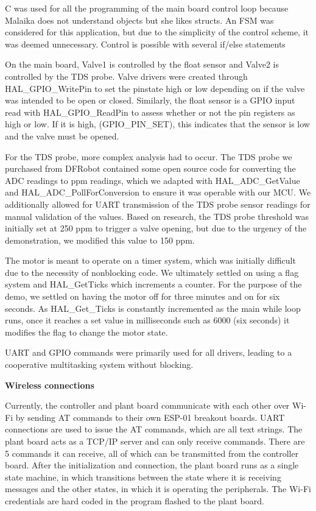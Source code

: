 C was used for all the programming of the main board control loop because Malaika does not understand objects but she likes structs. An FSM was considered for this application, but due to the simplicity of the control scheme, it was deemed unnecessary. Control is possible with several if/\+else statements

On the main board, Valve1 is controlled by the float sensor and Valve2 is controlled by the TDS probe. Valve drivers were created through HAL\+\_\+\+GPIO\+\_\+\+Write\+Pin to set the pinstate high or low depending on if the valve was intended to be open or closed. Similarly, the float sensor is a GPIO input read with HAL\+\_\+\+GPIO\+\_\+\+Read\+Pin to assess whether or not the pin registers as high or low. If it is high, (GPIO\+\_\+\+PIN\+\_\+\+SET), this indicates that the sensor is low and the valve must be opened.

For the TDS probe, more complex analysis had to occur. The TDS probe we purchased from DFRobot contained some open source code for converting the ADC readings to ppm readings, which we adapted with HAL\+\_\+\+ADC\+\_\+\+Get\+Value and HAL\+\_\+\+ADC\+\_\+\+Poll\+For\+Conversion to ensure it was operable with our MCU. We additionally allowed for UART transmission of the TDS probe sensor readings for manual validation of the values. Based on research, the TDS probe threshold was initially set at 250 ppm to trigger a valve opening, but due to the urgency of the demonstration, we modified this value to 150 ppm.

The motor is meant to operate on a timer system, which was initially difficult due to the necessity of nonblocking code. We ultimately settled on using a flag system and HAL\+\_\+\+Get\+Ticks which increments a counter. For the purpose of the demo, we settled on having the motor off for three minutes and on for six seconds. As HAL\+\_\+\+Get\+\_\+\+Ticks is constantly incremented as the main while loop runs, once it reaches a set value in milliseconds such as 6000 (six seconds) it modifies the flag to change the motor state.

UART and GPIO commands were primarily used for all drivers, leading to a cooperative multitasking system without blocking.

{\bfseries{Wireless connections}}

Currently, the controller and plant board communicate with each other over Wi-\/\+Fi by sending AT commands to their own ESP-\/01 breakout boards. UART connections are used to issue the AT commands, which are all text strings. The plant board acts as a TCP/\+\+IP server and can only receive commands. There are 5 commands it can receive, all of which can be transmitted from the controller board. After the initialization and connection, the plant board runs as a single state machine, in which transitions between the state where it is receiving messages and the other states, in which it is operating the peripherals. The Wi-\/\+Fi credentials are hard coded in the program flashed to the plant board.

